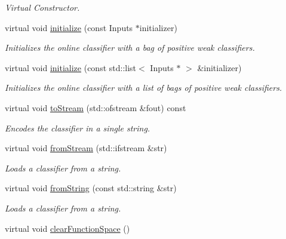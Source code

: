 \begin{DoxyCompactItemize}
\begin{DoxyCompactList}\small\item\em Virtual Constructor. \end{DoxyCompactList}\item 
virtual void \hyperlink{classiCub_1_1boostMIL_1_1OnlineSupport_a04a2a742236cd27e7809a8533aa1779b}{initialize} (const Inputs $\ast$initializer)
\begin{DoxyCompactList}\small\item\em Initializes the online classifier with a bag of positive weak classifiers. \end{DoxyCompactList}\item 
virtual void \hyperlink{classiCub_1_1boostMIL_1_1OnlineSupport_a0b2066e9da68debb01fb2b961a9c76d4}{initialize} (const std\+::list$<$ Inputs $\ast$ $>$ \&initializer)
\begin{DoxyCompactList}\small\item\em Initializes the online classifier with a list of bags of positive weak classifiers. \end{DoxyCompactList}\item 
virtual void \hyperlink{classiCub_1_1boostMIL_1_1OnlineSupport_a7d2c5146240c9cac93cdfa054d960c07}{to\+Stream} (std\+::ofstream \&fout) const 
\begin{DoxyCompactList}\small\item\em Encodes the classifier in a single string. \end{DoxyCompactList}\item 
virtual void \hyperlink{classiCub_1_1boostMIL_1_1OnlineSupport_a6f160fca47748fd00c99daf7a842304c}{from\+Stream} (std\+::ifstream \&str)
\begin{DoxyCompactList}\small\item\em Loads a classifier from a string. \end{DoxyCompactList}\item 
virtual void \hyperlink{classiCub_1_1boostMIL_1_1OnlineSupport_afb3af9ffed757a5bcd8f03d2c50695b0}{from\+String} (const std\+::string \&str)
\begin{DoxyCompactList}\small\item\em Loads a classifier from a string. \end{DoxyCompactList}\item 
virtual void \hyperlink{classiCub_1_1boostMIL_1_1OnlineSupport_ad0742d402eaf6eab2e79015376c3902c}{clear\+Function\+Space} ()\label{classiCub_1_1boostMIL_1_1OnlineSupport_ad0742d402eaf6eab2e79015376c3902c}


\end{DoxyCompactItemize}
